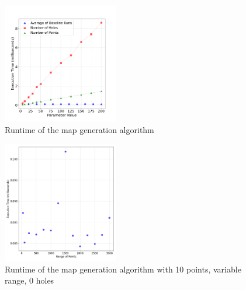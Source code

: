 \documentclass[final]{cmpreport_02}
\begin{document}
%
%


\begin{figure}[h!]
	\centering
	\includegraphics[width=0.45\textwidth]{./images/mapGenRTCombined.png}
	\caption{Runtime of the map generation algorithm}
	\label{PE:mg:Combined}
\end{figure}


\begin{figure}[h!]
	\centering
	\includegraphics[width=0.45\textwidth]{./images/mapGenRangeRT.png}
	\caption{Runtime of the map generation algorithm with 10 points, variable range, 0 holes}
	\label{PE:mg:range}
\end{figure}

\end{document}
